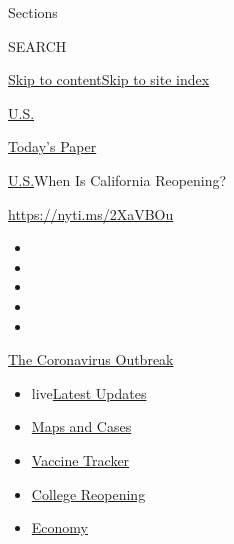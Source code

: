 Sections

SEARCH

\protect\hyperlink{site-content}{Skip to
content}\protect\hyperlink{site-index}{Skip to site index}

\href{https://www.nytimes3xbfgragh.onion/section/us}{U.S.}

\href{https://myaccount.nytimes3xbfgragh.onion/auth/login?response_type=cookie\&client_id=vi}{}

\href{https://www.nytimes3xbfgragh.onion/section/todayspaper}{Today's
Paper}

\href{/section/us}{U.S.}\textbar{}When Is California Reopening?

\url{https://nyti.ms/2XaVBOu}

\begin{itemize}
\item
\item
\item
\item
\item
\end{itemize}

\href{https://www.nytimes3xbfgragh.onion/news-event/coronavirus?action=click\&pgtype=Article\&state=default\&region=TOP_BANNER\&context=storylines_menu}{The
Coronavirus Outbreak}

\begin{itemize}
\tightlist
\item
  live\href{https://www.nytimes3xbfgragh.onion/2020/08/04/world/coronavirus-cases.html?action=click\&pgtype=Article\&state=default\&region=TOP_BANNER\&context=storylines_menu}{Latest
  Updates}
\item
  \href{https://www.nytimes3xbfgragh.onion/interactive/2020/us/coronavirus-us-cases.html?action=click\&pgtype=Article\&state=default\&region=TOP_BANNER\&context=storylines_menu}{Maps
  and Cases}
\item
  \href{https://www.nytimes3xbfgragh.onion/interactive/2020/science/coronavirus-vaccine-tracker.html?action=click\&pgtype=Article\&state=default\&region=TOP_BANNER\&context=storylines_menu}{Vaccine
  Tracker}
\item
  \href{https://www.nytimes3xbfgragh.onion/2020/08/02/us/covid-college-reopening.html?action=click\&pgtype=Article\&state=default\&region=TOP_BANNER\&context=storylines_menu}{College
  Reopening}
\item
  \href{https://www.nytimes3xbfgragh.onion/live/2020/08/04/business/stock-market-today-coronavirus?action=click\&pgtype=Article\&state=default\&region=TOP_BANNER\&context=storylines_menu}{Economy}
\end{itemize}

